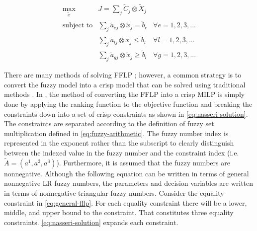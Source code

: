 \documentclass[ee,thesis]{usuthesis}
\begin{document}
\begin{equation}
\label{eq:general-fflp}
\begin{array}{lll}
\underset{{\tilde{x}}}{\text{max}} & J = \sum_j \tilde{C}_j \otimes \tilde{X}_j              &                 \\
\text{subject to}                  & \sum_j \tilde{a}_{ej} \otimes \tilde{x}_j = \tilde{b}_e &  \forall e = 1,2,3,... \\
                                   & \sum_j \tilde{a}_{lj} \otimes \tilde{x}_j \le \tilde{b}_l &  \forall l = 1,2,3,... \\
                                   & \sum_j \tilde{a}_{gj} \otimes \tilde{x}_j \ge \tilde{b}_l &  \forall g = 1,2,3,...
\end{array}
\end{equation}

There are many methods of solving FFLP
\cite{bello-2019-fuzzy-activ,kaur-2016-introd-fuzzy,ebrahimnejad-2016-new-method,nasseri-2013-fully}; however, a
common strategy is to convert the fuzzy model into a crisp model that can be solved using traditional methods
\cite{bello-2019-fuzzy-activ}. In \cite{nasseri-2013-fully,bello-2019-fuzzy-activ}, the method of converting the FFLP
into a crisp MILP is simply done by applying the ranking function to the objective function and breaking the constraints
down into a set of crisp constraints as shown in \ref{eq:nasseri-solution}. The constraints are separated according to the
definition of fuzzy set multiplication defined in \ref{eq:fuzzy-arithmetic}. The fuzzy number index is represented in the
exponent rather than the subscript to clearly distinguish between the indexed value in the fuzzy number and the
constraint index (i.e. \(\tilde{A} = (a^1,a^2,a^3)\)). Furthermore, it is assumed that the fuzzy numbers are nonnegative.
Although the following equation can be written in terms of general nonnegative LR fuzzy numbers, the parameters and
decision variables are written in terms of nonnegative triangular fuzzy numbers. Consider the equality constraint in
\ref{eq:general-fflp}. For each equality constraint there will be a lower, middle, and upper bound to the constraint. That
constitutes three equality constraints. \ref{eq:nasseri-solution} expands each constraint.
\end{document}
